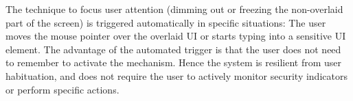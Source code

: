 

 The technique to focus user attention (dimming out or freezing the non-overlaid part of the screen) is triggered automatically in specific situations: The user moves the mouse pointer over the overlaid UI or starts typing into a sensitive UI element. 
The advantage of the automated trigger is that the user does not need to remember to activate the mechanism. Hence the system is resilient from user habituation, and does not require the user to actively monitor security indicators or perform specific actions.


%
%

